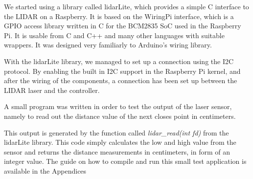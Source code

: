 We started using a library called lidarLite, which provides a simple C interface to the LIDAR on a Raspberry. It is based on the WiringPi interface, which is a GPIO access library written in C for the BCM2835 SoC used in the Raspberry Pi. It is usable from C and C++ and many other languages with suitable wrappers. It was designed very familiarly to Arduino's wiring library.

With the lidarLite library, we managed to set up a connection using the I2C protocol. By enabling the built in I2C support in the Raspberry Pi kernel, and after the wiring of the components, a connection has been set up between the LIDAR laser and the controller.


A small program was written in order to test the output of the laser sensor, namely to read out the distance value of the next closes point in centimeters. 


This output is generated by the function called \textit{lidar_read(int fd)} from the lidarLite library. This code simply calculates the low and high value from the sensor and returns the distance measurements in centimeters, in form of an integer value. The guide on how to compile and run this small test application is available in the Appendices \\ %

